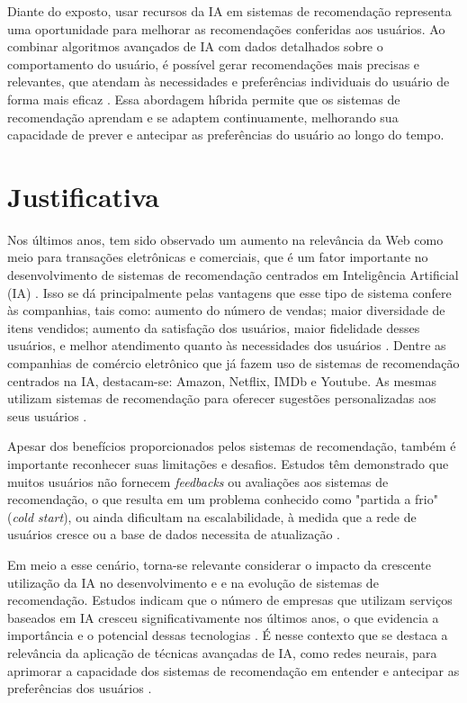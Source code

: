 Diante do exposto, usar recursos da IA em sistemas de recomendação representa uma oportunidade para melhorar as 
recomendações conferidas aos usuários. Ao combinar algoritmos avançados de IA
com dados detalhados sobre o comportamento do usuário, é possível gerar recomendações
mais precisas e relevantes, que atendam às necessidades e preferências individuais do usuário de forma mais eficaz
\cite{Karatzoglou}. Essa abordagem híbrida permite que os sistemas de recomendação aprendam e se adaptem continuamente, 
melhorando sua capacidade de prever e antecipar as preferências do usuário ao longo do tempo.

\section{Justificativa}\label{sec:justificativa}
Nos últimos anos, tem sido observado um aumento na relevância da Web como meio para transações 
eletrônicas e comerciais, que é um fator importante no desenvolvimento de sistemas de recomendação centrados em Inteligência 
Artificial (IA) \cite{Aggarwal2016}. Isso se dá principalmente pelas vantagens que esse tipo de sistema
confere às companhias, tais como: aumento do número de vendas; maior diversidade de itens
vendidos; aumento da satisfação dos usuários, maior fidelidade desses usuários, e melhor atendimento quanto às necessidades 
dos usuários \cite{Gunawardana2022}. Dentre as companhias de comércio eletrônico que já fazem uso de sistemas de 
recomendação centrados na IA, destacam-se: Amazon, Netflix, IMDb e Youtube. As mesmas utilizam sistemas de recomendação 
para oferecer sugestões personalizadas aos seus usuários \cite{deconstructing-recommender-systems}.

Apesar dos benefícios proporcionados pelos sistemas de recomendação, também é importante reconhecer suas limitações
e desafios. Estudos têm demonstrado que muitos usuários não fornecem \textit{feedbacks} ou avaliações aos sistemas de 
recomendação, o que resulta em um problema conhecido como "partida a frio" (\textit{cold start}), ou ainda dificultam na
escalabilidade, à medida que a rede de usuários cresce ou a base de dados necessita de atualização \cite{Mishra_2021}.  

Em meio a esse cenário, torna-se relevante considerar o impacto da crescente utilização da IA no
desenvolvimento e e na evolução de sistemas de recomendação. Estudos indicam que o número de empresas que utilizam 
serviços baseados em IA cresceu significativamente nos últimos anos, o que evidencia a importância e o potencial dessas
tecnologias \cite{perspectiva-dados-IA-2023}. É nesse contexto que se destaca a relevância da aplicação de técnicas 
avançadas de IA, como redes neurais, para aprimorar a capacidade dos sistemas de recomendação em entender
e antecipar as preferências dos usuários \cite{Zhang_Survey}.
 
